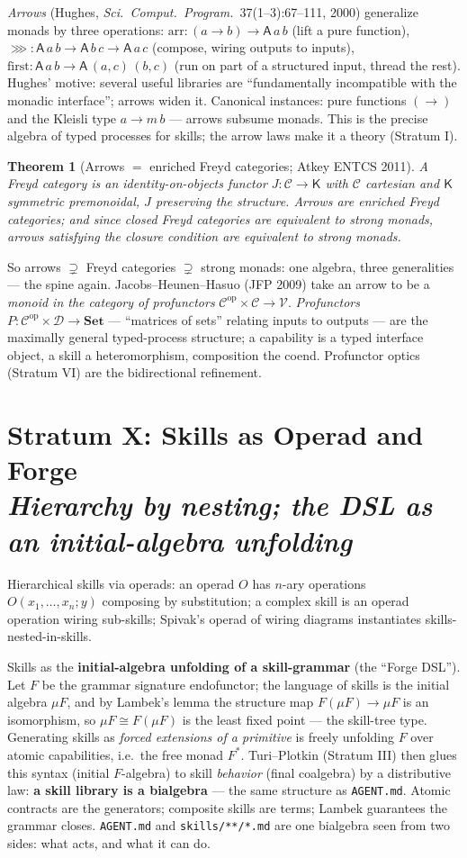 \documentclass[11pt]{article}
\theoremstyle{plain}
\newtheorem{theorem}{Theorem}[section]
\theoremstyle{definition}
\theoremstyle{remark}
\newcommand{\C}{\mathcal{C}}
\newcommand{\D}{\mathcal{D}}
\newcommand{\V}{\mathcal{V}}
\newcommand{\Set}{\mathbf{Set}}
\newcommand{\op}{\mathrm{op}}
\newcommand{\stratum}[2]{\section{#1\\ {\normalsize\normalfont\itshape #2}}}
\begin{document}
\emph{Arrows} (Hughes, \emph{Sci.\ Comput.\ Program.}\ 37(1--3):67--111, 2000) generalize monads by three operations: $\mathrm{arr}\colon (a\to b)\to \mathsf{A}\,a\,b$ (lift a pure function), ${\ggg}\colon \mathsf{A}\,a\,b \to \mathsf{A}\,b\,c \to \mathsf{A}\,a\,c$ (compose, wiring outputs to inputs), $\mathrm{first}\colon \mathsf{A}\,a\,b \to \mathsf{A}\,(a,c)\,(b,c)$ (run on part of a structured input, thread the rest). Hughes' motive: several useful libraries are ``fundamentally incompatible with the monadic interface''; arrows widen it. Canonical instances: pure functions $(\to)$ and the Kleisli type $a \to m\,b$ --- arrows subsume monads. This is the precise algebra of typed processes for skills; the arrow laws make it a theory (Stratum I).

\begin{theorem}[Arrows $=$ enriched Freyd categories; Atkey ENTCS 2011]\label{thm:freyd}
A Freyd category is an identity-on-objects functor $J\colon \C \to \mathsf{K}$ with $\C$ cartesian and $\mathsf{K}$ symmetric premonoidal, $J$ preserving the structure. Arrows are enriched Freyd categories; and since \emph{closed} Freyd categories are equivalent to strong monads, arrows satisfying the closure condition are equivalent to strong monads.
\end{theorem}

So arrows $\supsetneq$ Freyd categories $\supsetneq$ strong monads: one algebra, three generalities --- the spine again. Jacobs--Heunen--Hasuo (JFP 2009) take an arrow to be a \emph{monoid in the category of profunctors} $\C^{\op}\times\C \to \V$. \emph{Profunctors} $P\colon \C^{\op}\times \D \to \Set$ --- ``matrices of sets'' relating inputs to outputs --- are the maximally general typed-process structure; a capability is a typed interface object, a skill a heteromorphism, composition the coend. Profunctor optics (Stratum VI) are the bidirectional refinement.

\stratum{Stratum X: Skills as Operad and Forge}{Hierarchy by nesting; the DSL as an initial-algebra unfolding}

Hierarchical skills via operads: an operad $O$ has $n$-ary operations $O(x_1,\dots,x_n;y)$ composing by substitution; a complex skill is an operad operation wiring sub-skills; Spivak's operad of wiring diagrams instantiates skills-nested-in-skills.

Skills as the \textbf{initial-algebra unfolding of a skill-grammar} (the ``Forge DSL''). Let $F$ be the grammar signature endofunctor; the language of skills is the initial algebra $\mu F$, and by Lambek's lemma the structure map $F(\mu F)\to \mu F$ is an isomorphism, so $\mu F \cong F(\mu F)$ is the least fixed point --- the skill-tree type. Generating skills as \emph{forced extensions of a primitive} is freely unfolding $F$ over atomic capabilities, i.e.\ the free monad $F^{*}$. Turi--Plotkin (Stratum III) then glues this syntax (initial $F$-algebra) to skill \emph{behavior} (final coalgebra) by a distributive law: \textbf{a skill library is a bialgebra} --- the same structure as \texttt{AGENT.md}. Atomic contracts are the generators; composite skills are terms; Lambek guarantees the grammar closes. \texttt{AGENT.md} and \texttt{skills/**/*.md} are one bialgebra seen from two sides: what acts, and what it can do.
\end{document}
